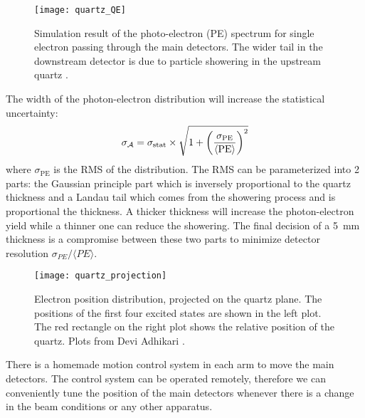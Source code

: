 \begin{figure}[!h]
    \centering
    \texttt{[image: quartz\_QE]}
    \caption{Simulation result of the photo-electron (PE) spectrum for single electron
    passing through the main detectors. The wider tail in the downstream
    detector is due to particle showering in the upstream quartz \cite{Devi2021}. 
    }
\end{figure}
The width of the photon-electron distribution will increase the statistical uncertainty:
\begin{equation}
    \sigma_{\mathcal{A}} = \sigma_{\text{stat}} \times \sqrt{1 + \left( \frac{\sigma_{\text{PE}}}{\langle \text{PE} \rangle }\right)^2}
\end{equation}
where $\sigma_{\text{PE}}$ is the RMS of the distribution. The RMS can be parameterized
into 2 parts: the Gaussian principle part which is inversely proportional to
the quartz thickness and a Landau tail which comes from the showering process
and is proportional the thickness. A thicker thickness will increase the 
photon-electron yield while a thinner one can reduce the showering.
The final decision of a 5~mm thickness is a compromise between these two parts 
to minimize detector resolution $\sigma_{PE}/\langle PE \rangle$. 

\begin{figure}[!h]
    \centering
    \texttt{[image: quartz\_projection]}
    \caption{Electron position distribution, projected on the quartz plane. 
    The positions of the first four excited states are shown in the left plot. 
    The red rectangle on the right plot shows the relative position of the quartz.
    Plots from Devi Adhikari \cite{Devi2021}.}
\end{figure}

There is a homemade motion control system in each arm to move the main detectors.
The control system can be operated remotely, therefore we can conveniently tune
the position of the main detectors whenever there is a change in the beam
conditions or any other apparatus.


